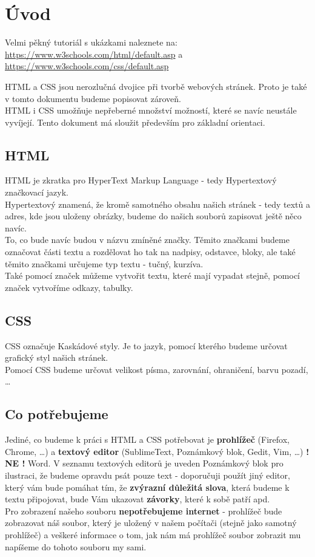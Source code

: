 \section{Úvod}
Velmi pěkný tutoriál s ukázkami naleznete na: \url{https://www.w3schools.com/html/default.asp} a \url{https://www.w3schools.com/css/default.asp}\\

\vspace{0.5cm}

HTML a CSS jsou nerozlučná dvojice při tvorbě webových stránek. Proto je také v tomto dokumentu budeme popisovat zároveň. \\

HTML i CSS umožňuje nepřeberné množství možností, které se navíc neustále vyvíjejí. Tento dokument má sloužit především pro základní orientaci.

\subsection{HTML}
HTML je zkratka pro HyperText Markup Language - tedy Hypertextový značkovací jazyk.\\
Hypertextový znamená, že kromě samotného obsahu našich stránek - tedy textů a adres, kde jsou uloženy obrázky, budeme do našich souborů zapisovat ještě něco navíc.\\
To, co bude navíc budou v názvu zmíněné značky. Těmito značkami budeme označovat části textu a rozdělovat ho tak na nadpisy, odstavce, bloky, ale také těmito značkami určujeme typ textu - tučný, kurzíva.\\
Také pomocí značek můžeme vytvořit  textu, které mají vypadat stejně, pomocí značek vytvoříme odkazy, tabulky.

\subsection{CSS}
CSS označuje Kaskádové styly. Je to jazyk, pomocí kterého budeme určovat grafický styl našich stránek.\\
Pomocí CSS budeme určovat velikost písma, zarovnání, ohraničení, barvu pozadí, \dots

\subsection{Co potřebujeme}
Jediné, co budeme k práci s HTML a CSS potřebovat je \textbf{prohlížeč} (Firefox, Chrome, \dots) a \textbf{textový editor} (SublimeText, Poznámkový blok, Gedit, Vim, \dots) \textbf{! NE !} Word. V seznamu textových editorů je uveden Poznámkový blok pro ilustraci, že budeme opravdu psát pouze text - doporučuji použít jiný editor, který vám bude pomáhat tím, že \textbf{zvýrazní důležitá slova}, která budeme k textu připojovat, bude Vám ukazovat \textbf{závorky}, které k sobě patří apd.\\
Pro zobrazení našeho souboru \textbf{nepotřebujeme internet} - prohlížeč bude zobrazovat náš soubor, který je uložený v našem počítači (stejně jako samotný prohlížeč) a veškeré informace o tom, jak nám má prohlížeč soubor zobrazit mu napíšeme do tohoto souboru my sami.